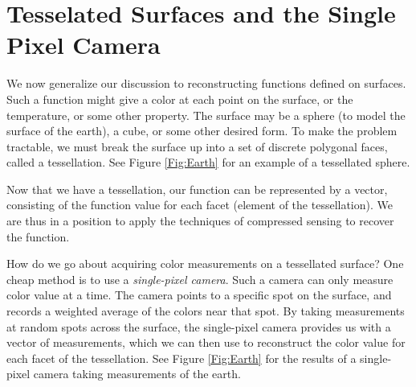 \section*{Tesselated Surfaces and the Single Pixel Camera}
We now generalize our discussion to reconstructing functions defined on surfaces. Such a function might
give a color at each point on the surface, or the temperature, or some other property. The surface may be
a sphere (to model the surface of the earth), a cube, or some other desired form. To make the problem
tractable, we must break the surface up into a set of discrete polygonal faces, called a tessellation. See
Figure \ref{Fig:Earth} for an example of a tessellated sphere.

Now that we have a tessellation, our function can be represented by a vector, consisting of the function value
for each facet (element of the tessellation). We are thus in a position to apply the techniques of compressed
sensing to recover the function.

How do we go about acquiring color measurements on a tessellated surface? One cheap method is to use a \emph{single-pixel
camera}. Such a camera can only measure color value at a time. The camera points to a specific spot on the surface, and
records a weighted average of the colors near that spot. By taking measurements at random spots across the surface,
the single-pixel camera provides us with a vector of measurements, which we can then use to reconstruct the color value for
each facet of the tessellation. See Figure \ref{Fig:Earth} for the results of a single-pixel camera taking measurements of the earth.

